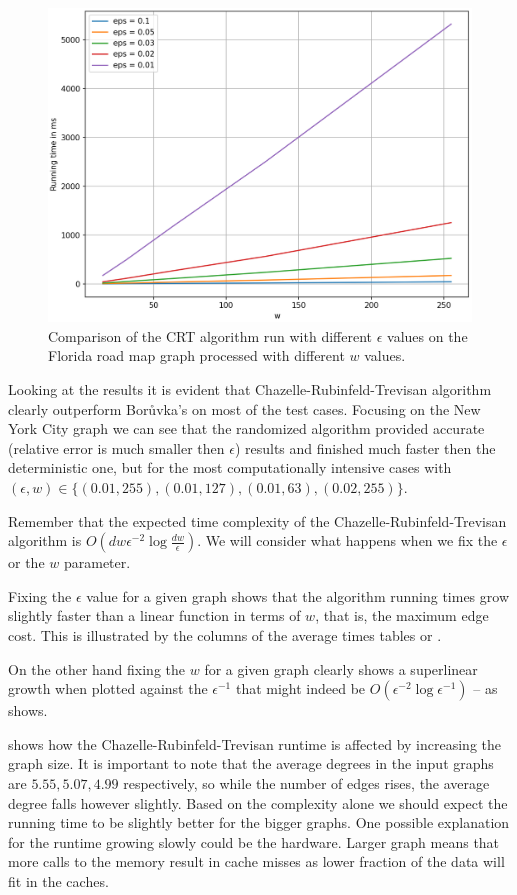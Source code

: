 \begin{figure}[H]
    \centering
    \includegraphics[width=0.9\linewidth]{figures/FLADrifferentWs.png}
    \caption{Comparison of the CRT algorithm run with different $\epsilon$ values on the Florida road map graph processed with different $w$ values.}
    \label{fig:flaws}
\end{figure}

Looking at the results it is evident that Chazelle-Rubinfeld-Trevisan algorithm clearly outperform Borůvka's on most of the test cases. Focusing on the New York City graph we can see that the randomized algorithm provided accurate (relative error is much smaller then $\epsilon$) results and finished much faster then the deterministic one, but for the most computationally intensive cases with $(\epsilon, w) \in \{(0.01, 255), (0.01, 127), (0.01, 63), (0.02, 255)\}$.

Remember that the expected time complexity of the Chazelle-Rubinfeld-Trevisan algorithm is $O(dw\epsilon^{-2}\log \frac{dw}{\epsilon})$. We will consider what happens when we fix the $\epsilon$ or the $w$ parameter. 

Fixing the $\epsilon$ value for a given graph shows that the algorithm running times grow slightly faster than a linear function in terms of $w$, that is, the maximum edge cost. This is illustrated by the columns of the average times tables or .

On the other hand fixing the $w$ for a given graph clearly shows a superlinear growth when plotted against the $\epsilon^{-1}$ that might indeed be $O(\epsilon^{-2}\log{\epsilon^{-1}})$ -- as  shows.

 shows how the Chazelle-Rubinfeld-Trevisan runtime is affected by increasing the graph size. It is important to note that the average degrees in the input graphs are $5.55, 5.07, 4.99$ respectively, so while the number of edges rises, the average degree falls however slightly. Based on the complexity alone we should expect the running time to be slightly better for the bigger graphs. One possible explanation for the runtime growing slowly could be the hardware. Larger graph means that more calls to the memory result in cache misses as lower fraction of the data will fit in the caches.

